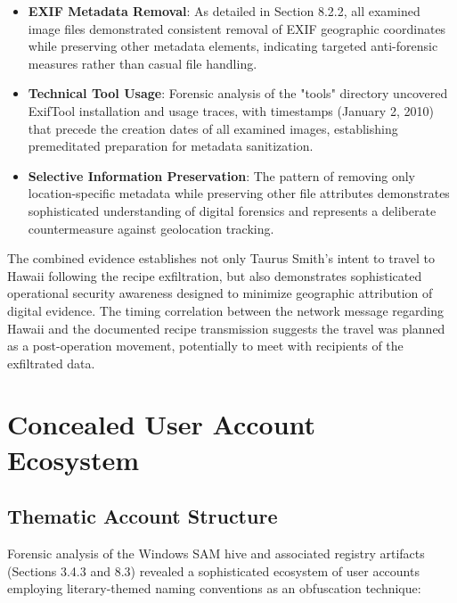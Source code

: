 \begin{itemize}
    \item \textbf{EXIF Metadata Removal}: As detailed in Section 8.2.2, all examined image files demonstrated consistent removal of EXIF geographic coordinates while preserving other metadata elements, indicating targeted anti-forensic measures rather than casual file handling.
    
    \item \textbf{Technical Tool Usage}: Forensic analysis of the "tools" directory uncovered ExifTool installation and usage traces, with timestamps (January 2, 2010) that precede the creation dates of all examined images, establishing premeditated preparation for metadata sanitization.
    
    \item \textbf{Selective Information Preservation}: The pattern of removing only location-specific metadata while preserving other file attributes demonstrates sophisticated understanding of digital forensics and represents a deliberate countermeasure against geolocation tracking.
\end{itemize}

The combined evidence establishes not only Taurus Smith's intent to travel to Hawaii following the recipe exfiltration, but also demonstrates sophisticated operational security awareness designed to minimize geographic attribution of digital evidence. The timing correlation between the network message regarding Hawaii and the documented recipe transmission suggests the travel was planned as a post-operation movement, potentially to meet with recipients of the exfiltrated data.

\section{Concealed User Account Ecosystem}
\subsection{Thematic Account Structure}
Forensic analysis of the Windows SAM hive and associated registry artifacts (Sections 3.4.3 and 8.3) revealed a sophisticated ecosystem of user accounts employing literary-themed naming conventions as an obfuscation technique:

